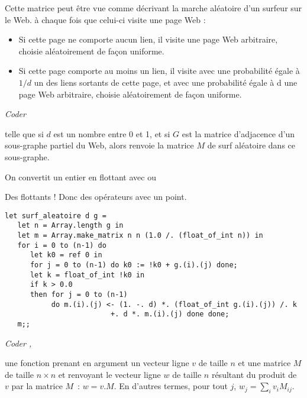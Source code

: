 Cette matrice peut être vue comme décrivant la marche aléatoire d'un surfeur sur le Web. à chaque fois que celui-ci visite une page Web :
\begin{itemize}
\item Si cette page ne comporte aucun lien, il visite une page Web arbitraire, choisie aléatoirement de façon uniforme.
\item Si cette page comporte au moins un lien, il visite avec une probabilité égale à  $1/d$ un des liens sortants de cette page, et avec une probabilité égale à d une page Web arbitraire, choisie aléatoirement de façon uniforme.
\end{itemize}
\begin{Exercise}\it 
Coder  

telle que si $d$ est un nombre entre 0 et 1, et si $G$ est la matrice d'adjacence d'un sous-graphe partiel du Web, alors  renvoie la matrice $M$ de surf aléatoire dans ce sous-graphe.

On convertit un entier en flottant avec  ou 
\end{Exercise}
\begin{Answer}
Des flottants ! Donc des opérateurs avec un point.
\begin{lstlisting}
let surf_aleatoire d g = 
   let n = Array.length g in
   let m = Array.make_matrix n n (1.0 /. (float_of_int n)) in
   for i = 0 to (n-1) do
      let k0 = ref 0 in
      for j = 0 to (n-1) do k0 := !k0 + g.(i).(j) done;
      let k = float_of_int !k0 in
      if k > 0.0 
      then for j = 0 to (n-1) 
           do m.(i).(j) <- (1. -. d) *. (float_of_int g.(i).(j)) /. k
                         +. d *. m.(i).(j) done done;
   m;;
\end{lstlisting}
\end{Answer}
\begin{Exercise}\it 
Coder , 

une fonction prenant en argument un vecteur ligne $v$ de taille $n$ et une matrice $M$ de taille $n\times n$ et renvoyant le vecteur ligne $w$ de taille $n$ résultant du produit de $v$ par la matrice $M$~: $w = v.M$. En d'autres termes, pour tout $j$, $w_j=\sum_i v_iM_{ij}$.
\end{Exercise}
